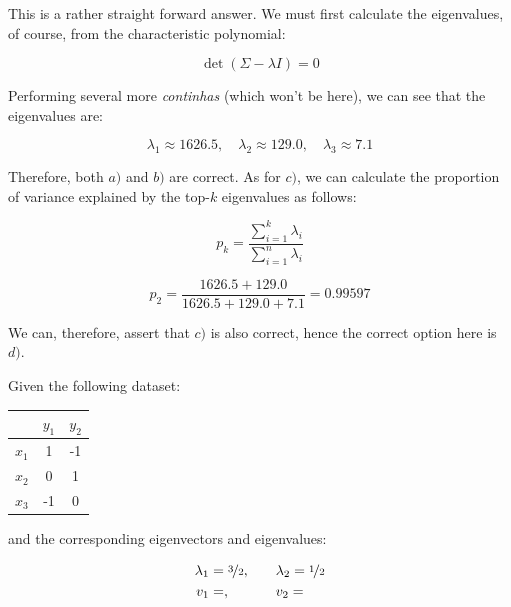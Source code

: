 \documentclass[12pt]{article}
\begin{document}
\begin{enumerate}[leftmargin=\labelsep]
  This is a rather straight forward answer. We must first calculate the
  eigenvalues, of course, from the characteristic polynomial:

  \begin{equation*}
    \det(\Sigma - \lambda I) = 0
  \end{equation*}

  Performing several more \textit{continhas} (which won't be here), we can see that the eigenvalues
  are:

  \begin{equation*}
    \lambda_1 \approx 1626.5, \quad \lambda_2 \approx 129.0, \quad \lambda_3 \approx 7.1
  \end{equation*}

  Therefore, both $a)$ and $b)$ are correct. As for $c)$, we can calculate the proportion of
  variance explained by the top-$k$ eigenvalues as follows:

  \begin{equation*}
    p_k = \frac{\sum_{i=1}^k \lambda_i}{\sum_{i=1}^n \lambda_i}
  \end{equation*}

  \begin{equation*}
    p_2 = \frac{1626.5 + 129.0}{1626.5 + 129.0 + 7.1} = 0.99597
  \end{equation*}

  We can, therefore, assert that $c)$ is also correct, hence the correct option
  here is $d)$.

  \begin{tcolorbox}[enhanced jigsaw,halign=center,colback=bg,boxrule=0pt,arc=1pt]
    \item Given the following dataset:

    \begin{table}[H]
      \centering
      \begin{tabular}{c|c|c}
              & $y_1$ & $y_2$ \\ \hline
        $x_1$ & 1     & -1    \\
        $x_2$ & 0     & 1     \\
        $x_3$ & -1    & 0
      \end{tabular}
    \end{table}

    and the corresponding eigenvectors and eigenvalues:

    \begin{equation*}
      \begin{aligned}
        \lambda_1 & = \nicefrac{3}{2}, \quad               &  & \lambda_2         = \nicefrac{1}{2} \\
        v_1       & = , \quad &  & v_2 = 
      \end{aligned}
    \end{equation*}


\end{tcolorbox}
\end{enumerate}
\end{document}
